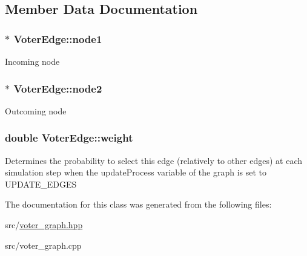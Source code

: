 \subsection{Member Data Documentation}
\hypertarget{classVoterEdge_aaa3e4febee48a905652ba142b8a48b7e}{
\subsubsection[{node1}]{$\ast$ Voter\-Edge\-::node1}}\label{classVoterEdge_aaa3e4febee48a905652ba142b8a48b7e}
Incoming node \hypertarget{classVoterEdge_a2483bd0524c590213c0abd33f7a5de2b}{
\subsubsection[{node2}]{$\ast$ Voter\-Edge\-::node2}}\label{classVoterEdge_a2483bd0524c590213c0abd33f7a5de2b}
Outcoming node \hypertarget{classVoterEdge_a08b1042475d9628a0da0e7ebf8557923}{
\subsubsection[{weight}]{\setlength{\rightskip}{0pt plus 5cm}double Voter\-Edge\-::weight}}\label{classVoterEdge_a08b1042475d9628a0da0e7ebf8557923}
Determines the probability to select this edge (relatively to other edges) at each simulation step when the update\-Process variable of the graph is set to U\-P\-D\-A\-T\-E\-\_\-\-E\-D\-G\-E\-S 

The documentation for this class was generated from the following files\-:\begin{DoxyCompactItemize}
\item 
src/\hyperlink{voter__graph_8hpp}{voter\-\_\-graph.\-hpp}\item 
src/voter\-\_\-graph.\-cpp\end{DoxyCompactItemize}
